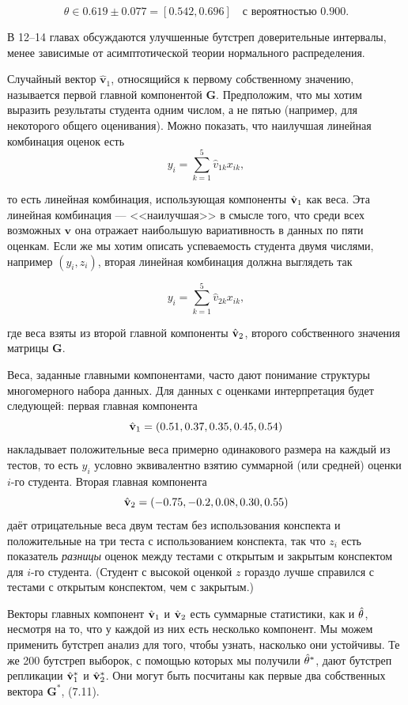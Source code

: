 $$
\theta \in 0.619 \pm 0.077 = [ 0.542,0.696]\quad \text{с вероятностью }  0.900. 
$$

В 12--14 главах обсуждаются улучшенные бутстреп доверительные интервалы, менее зависимые от асимптотической теории нормального распределения.

Случайный вектор $\hat{\mathbf v}_1$, относящийся к первому собственному значению, называется первой главной компонентой $\mathbf G$. Предположим, что мы хотим выразить результаты студента одним числом, а не пятью (например, для некоторого общего оценивания). Можно показать, что наилучшая линейная комбинация оценок есть 
\begin{equation}
  y_i = \sum_{k=1}^5 \hat{v}_{1k} x_{ik},
\end{equation}

то есть линейная комбинация, использующая компоненты $\hat{\mathbf{v}}_1$ как веса. Эта линейная комбинация --- <<наилучшая>> в смысле того, что среди всех возможных $\mathbf v$ она отражает наибольшую вариативность в данных по пяти оценкам. Если же мы хотим описать успеваемость студента двумя числями, например $(y_i,z_i)$, вторая линейная комбинация должна выглядеть так

\begin{equation}
  y_i = \sum_{k=1}^5 \hat{v}_{2k} x_{ik},
\end{equation}

где веса взяты из второй главной компоненты $\hat{\mathbf{v}}_2$, второго собственного значения матрицы $\mathbf G$.

Веса, заданные главными компонентами, часто дают понимание структуры многомерного набора данных. Для данных с оценками интерпретация будет следующей: первая главная компонента $$\hat{\mathbf{v}}_1 = (0.51, 0.37, 0.35, 0.45, 0.54)$$ накладывает положительные веса примерно одинакового размера на каждый из тестов, то есть $y_i$ условно эквивалентно взятию суммарной (или средней) оценки $i$-го студента. Вторая главная компонента $$\hat{\mathbf{v}}_2 = (-0.75, -0.2, 0.08, 0.30, 0.55)$$ даёт отрицательные веса двум тестам без использования конспекта и положительные на три теста с использованием конспекта, так что $z_i$ есть показатель \textit{разницы} оценок между тестами с открытым и закрытым конспектом для $i$-го студента. (Студент с высокой оценкой $z$ гораздо лучше справился с тестами с открытым конспектом, чем с закрытым.)

Векторы главных компонент $\hat{\mathbf{v}}_1$ и $\hat{\mathbf{v}}_2$ есть суммарные статистики, как и $\hat \theta$, несмотря на то, что у каждой из них есть несколько компонент. Мы можем применить бутстреп анализ для того, чтобы узнать, насколько они устойчивы. Те же 200 бутстреп выборок, с помощью которых мы получили $\hat \theta^*$, дают бутстреп репликации $\hat{\mathbf{v}}_1^*$ и $\hat{\mathbf{v}}_2^*$. Они могут быть посчитаны как первые два собственных вектора $\mathbf G^*$, (7.11).

